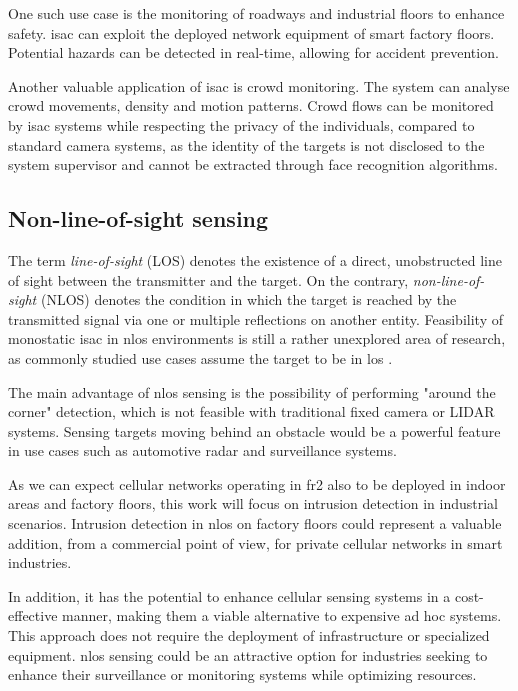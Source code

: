 	One such use case is the monitoring of roadways and industrial floors to enhance safety. \Gls{isac} can exploit the deployed network equipment of smart factory floors. Potential hazards can be detected in real-time, allowing for accident prevention. 
	
	Another valuable application of \gls{isac} is crowd monitoring. 
	The system can analyse crowd movements, density and motion patterns. 
	Crowd flows can be monitored by \gls{isac} systems while respecting the privacy of the individuals, compared to standard camera systems, as the identity of the targets is not disclosed to the system supervisor and cannot be extracted through face recognition algorithms.

	
	\subsection{Non-line-of-sight sensing}
	
	
	
	The term \textit{line-of-sight} (LOS)  denotes the existence of a direct, unobstructed line of sight between the transmitter and the target. On the contrary, \textit{non-line-of-sight} (NLOS) denotes the condition in which the target is reached by the transmitted signal via one or multiple reflections on another entity. 
	Feasibility of monostatic \gls{isac} in \gls{nlos} environments is still a rather unexplored area of research, as commonly studied use cases assume the target to be in \gls{los} \cite{Gustaffson_NLOS_radar}.
	
	The main advantage of \gls{nlos} sensing is the possibility of performing "around the corner" detection, which is not feasible with traditional fixed camera or LIDAR systems. 
	Sensing targets moving behind an obstacle would be a powerful feature in use cases such as automotive radar and surveillance systems.
	
	As we can expect cellular networks operating in \gls{fr2} also to be deployed in indoor areas and factory floors, this work will focus on intrusion detection in industrial scenarios.
	Intrusion detection in \gls{nlos} on factory floors could represent a valuable addition, from a commercial point of view, for private cellular networks in smart industries.
	
	In addition, it has the potential to enhance cellular sensing systems in a cost-effective manner, making them a viable alternative to expensive ad hoc systems. This approach does not require the deployment of infrastructure or specialized equipment. 
	\gls{nlos} sensing could be an attractive option for industries seeking to enhance their surveillance or monitoring systems while optimizing resources.
	
	
	

